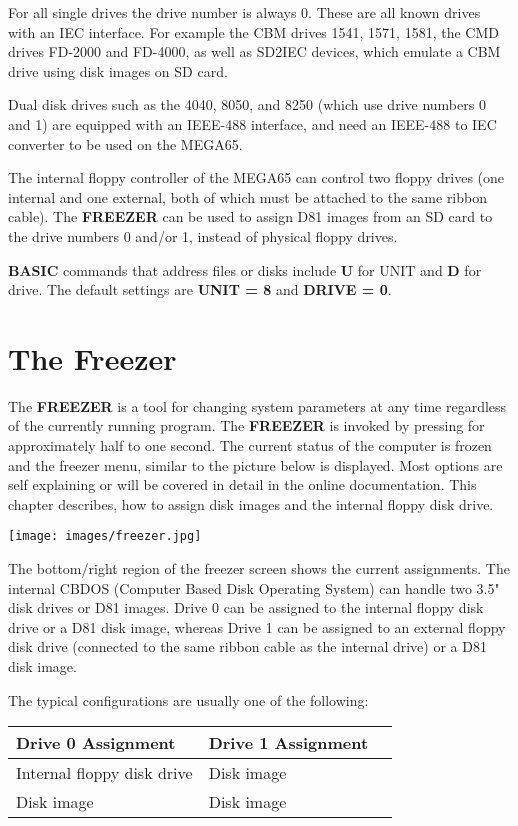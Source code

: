 For all single drives the drive number is always 0.
These are all known drives with an IEC interface. For example
the CBM drives 1541, 1571, 1581, the CMD drives FD-2000 and FD-4000, as well as
SD2IEC devices, which emulate a CBM drive using disk images on SD card.

Dual disk drives such as the 4040, 8050, and 8250 (which use drive numbers
0 and 1) are equipped with an IEEE-488 interface, and need
an IEEE-488 to IEC converter to be used on the MEGA65.

The internal floppy controller of the MEGA65 can control
two floppy drives (one internal and one external, both of which must be attached to the same
ribbon cable). The {\bf FREEZER} can be used to assign D81 images from an
SD card to the drive numbers 0 and/or 1, instead of physical floppy drives.

{\bf BASIC} commands that address files or disks include
{\bf U} for UNIT and {\bf D} for drive.
The default settings are {\bf UNIT = 8} and {\bf DRIVE = 0}.

\section{The Freezer}
The {\bf FREEZER} is a tool for changing system parameters at any time
regardless of the currently running program. The {\bf FREEZER} is invoked
by pressing  for approximately half to one second.
The current status of the computer is frozen and the freezer menu,
similar to the picture below is displayed.
Most options are self explaining or will be covered in detail in the
online documentation. This chapter describes, how to assign disk images
and the internal floppy disk drive.

\begin{center}
\texttt{[image: images/freezer.jpg]}
\end{center}

The bottom/right region of the freezer screen shows the current assignments.
The internal CBDOS (Computer Based Disk Operating System) can handle two
3.5" disk drives or D81 images.
Drive 0 can be assigned to the internal floppy disk drive or a D81 disk image,
whereas Drive 1 can be assigned to an external floppy disk drive (connected to the
same ribbon cable as the internal drive) or a D81 disk image.

The typical configurations are usually one of the following:
\begin{center}
\begin{tabular}{|l|l|l|}
\hline
{\bf Drive 0 Assignment} & {\bf Drive 1 Assignment} \\
\hline
Internal floppy disk drive &  Disk image \\
Disk image                 &  Disk image \\
\hline
\end{tabular}
\end{center}

